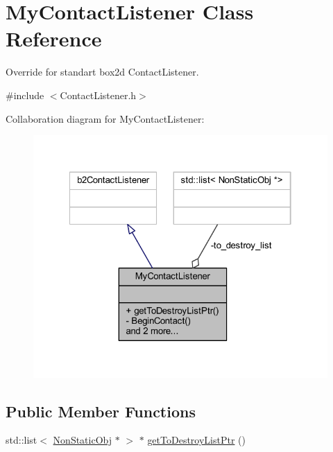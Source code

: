 \hypertarget{class_my_contact_listener}{}\section{My\+Contact\+Listener Class Reference}
\label{class_my_contact_listener}


Override for standart box2d Contact\+Listener.  




{\ttfamily \#include $<$Contact\+Listener.\+h$>$}



Collaboration diagram for My\+Contact\+Listener\+:\nopagebreak
\begin{figure}[H]
\begin{center}
\leavevmode
\includegraphics[width=322pt]{class_my_contact_listener__coll__graph}
\end{center}
\end{figure}
\subsection*{Public Member Functions}
\begin{DoxyCompactItemize}
\item 
std\+::list$<$ \hyperlink{class_non_static_obj}{Non\+Static\+Obj} $\ast$ $>$ $\ast$ \hyperlink{class_my_contact_listener_a3e414c674f98a2f35e2c894923d045b2}{get\+To\+Destroy\+List\+Ptr} ()
\end{DoxyCompactItemize}
